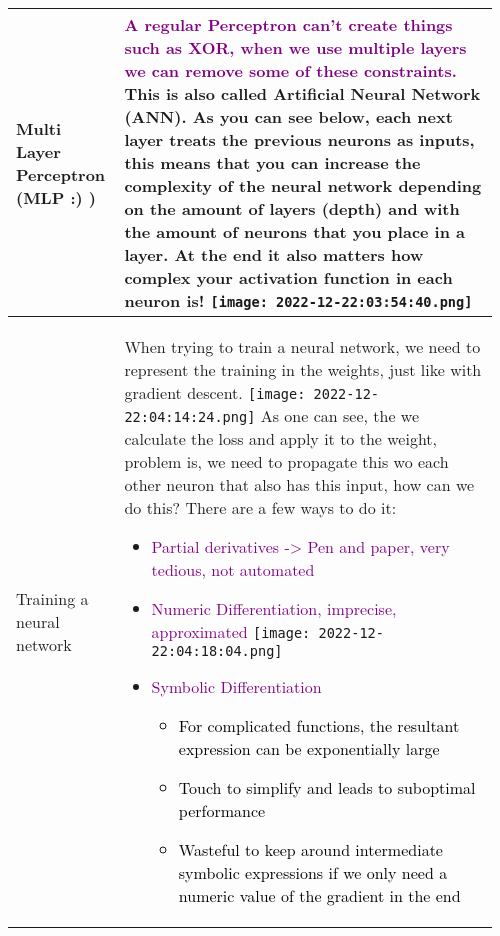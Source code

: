 \documentclass[main.tex,fontsize=8pt,paper=a4,paper=portrait,DIV=calc,]{scrartcl}
\begin{document}
\pagebreak
\begin{table}[ht!]
\begin{tabular}{|m{0.2\linewidth}|m{0.755\linewidth}|}
\hline
Multi Layer Perceptron (MLP :) ) & 
\textcolor{purple}{A regular Perceptron can't create things such as \textbf{XOR}, when we use multiple layers we can remove some of these constraints.}\newline
This is also called \textbf{Artificial Neural Network (ANN).}\newline
As you can see below, each next layer treats the previous neurons as inputs, this means that you can increase the complexity of the neural network depending on the amount of layers \textbf{(depth)} and with the amount of neurons that you place in a layer.\newline
At the end it also matters how complex your \textbf{activation function in each neuron is!}\newline
\texttt{[image: 2022-12-22:03:54:40.png]}\\
\hline
Training a neural network & 
When trying to train a neural network, we need to represent the training in the weights, just like with gradient descent.\newline
\texttt{[image: 2022-12-22:04:14:24.png]}\newline
As one can see, the we calculate the loss and apply it to the weight, problem is, we need to propagate this wo each other neuron that also has this input, how can we do this?\newline
There are a few ways to do it:\newline
\begin{itemize}
\item \textcolor{purple}{Partial derivatives -> Pen and paper, very tedious, not automated}
\item \textcolor{purple}{Numeric Differentiation, imprecise, approximated}\newline
\texttt{[image: 2022-12-22:04:18:04.png]}
\item \textcolor{purple}{Symbolic Differentiation}\newline
  \begin{itemize}
  \item \textcolor{black}{For complicated functions, the resultant expression can be exponentially large}
  \item \textcolor{black}{Touch to simplify and leads to suboptimal performance}
  \item \textcolor{black}{Wasteful to keep around intermediate symbolic expressions if we only need a numeric value of the gradient in the end}

\end{itemize}
\end{itemize}
\end{tabular}
\end{table}
\end{document}
